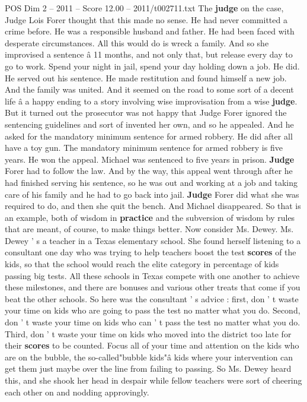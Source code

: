 \begin{textsample}{POS Dim 2 – 2011 – Score 12.00 – 2011/t002711.txt}
The \textbf{judge} on the case, Judge Lois Forer thought that this made no sense.
He had never committed a crime before.
He was a responsible husband and father.
He had been faced with desperate circumstances.
All this would do is wreck a family.
And so she improvised a sentence â 11 months, and not only that, but release every day to go to work.
Spend your night in jail, spend your day holding down a job.
He did.
He served out his sentence.
He made restitution and found himself a new job.
And the family was united.
And it seemed on the road to some sort of a decent life â a happy ending to a story involving wise improvisation from a wise \textbf{judge}.
But it turned out the prosecutor was not happy that Judge Forer ignored the sentencing guidelines and sort of invented her own, and so he appealed.
And he asked for the mandatory minimum sentence for armed robbery.
He did after all have a toy gun.
The mandatory minimum sentence for armed robbery is five years.
He won the appeal.
Michael was sentenced to five years in prison. \textbf{Judge} Forer had to follow the law.
And by the way, this appeal went through after he had finished serving his sentence, so he was out and working at a job and taking care of his family and he had to go back into jail. \textbf{Judge} Forer did what she was required to do, and then she quit the bench.
And Michael disappeared.
So that is an example, both of wisdom in \textbf{practice} and the subversion of wisdom by rules that are meant, of course, to make things better.
Now consider Ms.
Dewey.
Ms.
Dewey ' s a teacher in a Texas elementary school.
She found herself listening to a consultant one day who was trying to help teachers boost the test \textbf{scores} of the kids, so that the school would reach the elite category in percentage of kids passing big tests.
All these schools in Texas compete with one another to achieve these milestones, and there are bonuses and various other treats that come if you beat the other schools.
So here was the consultant ' s advice : first, don ' t waste your time on kids who are going to pass the test no matter what you do.
Second, don ' t waste your time on kids who can ' t pass the test no matter what you do.
Third, don ' t waste your time on kids who moved into the district too late for their \textbf{scores} to be counted.
Focus all of your time and attention on the kids who are on the bubble, the so-called"bubble kids"â kids where your intervention can get them just maybe over the line from failing to passing.
So Ms.
Dewey heard this, and she shook her head in despair while fellow teachers were sort of cheering each other on and nodding approvingly.

\end{textsample}
